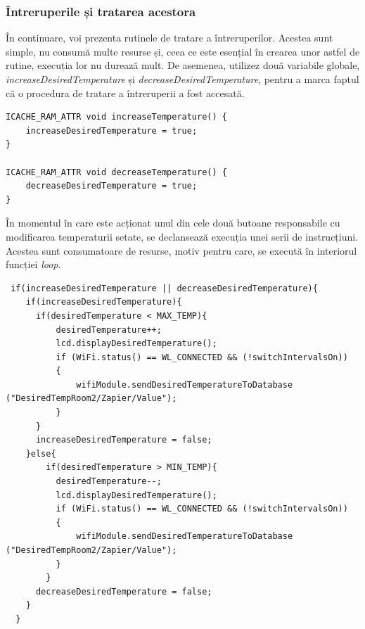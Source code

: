 \subsubsection{Întreruperile și tratarea acestora}

	În continuare, voi prezenta rutinele de tratare a întreruperilor. Acestea sunt simple, nu consumă multe resurse și, ceea ce este esențial în crearea unor astfel de rutine, execuția lor nu durează mult. De asemenea, utilizez două variabile globale, \textit{increaseDesiredTemperature} și \textit{decreaseDesiredTemperature}, pentru a marca faptul că o procedura de tratare a întreruperii a fost accesată.

\vspace{1em}

\begin{lstlisting}
ICACHE_RAM_ATTR void increaseTemperature() {
    increaseDesiredTemperature = true;
}

ICACHE_RAM_ATTR void decreaseTemperature() {
    decreaseDesiredTemperature = true;
}  
\end{lstlisting}

\vspace{2em}	

	În momentul în care este acționat unul din cele două butoane responsabile cu modificarea temperaturii setate, se declansează execuția unei serii de instrucțiuni. Acestea sunt consumatoare de resurse, motiv pentru care, se execută în interiorul funcției \textit{loop}. 


\vspace{1em}

\begin{lstlisting}
 if(increaseDesiredTemperature || decreaseDesiredTemperature){
    if(increaseDesiredTemperature){
      if(desiredTemperature < MAX_TEMP){
          desiredTemperature++;
          lcd.displayDesiredTemperature();
          if (WiFi.status() == WL_CONNECTED && (!switchIntervalsOn))
          {
              wifiModule.sendDesiredTemperatureToDatabase ("DesiredTempRoom2/Zapier/Value");
          }
      }
      increaseDesiredTemperature = false;
    }else{
        if(desiredTemperature > MIN_TEMP){
          desiredTemperature--;
          lcd.displayDesiredTemperature();
          if (WiFi.status() == WL_CONNECTED && (!switchIntervalsOn))
          {
              wifiModule.sendDesiredTemperatureToDatabase ("DesiredTempRoom2/Zapier/Value");
          }
        }
      decreaseDesiredTemperature = false;
    }
  }
\end{lstlisting}

